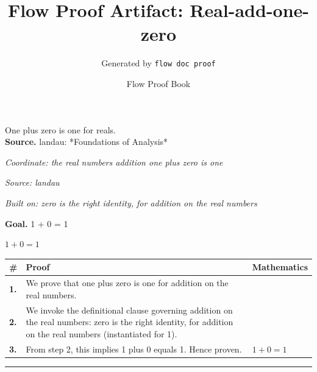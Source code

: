 \documentclass[11pt]{article}
\title{Flow Proof Artifact: Real-add-one-zero}
\author{Generated by \texttt{flow doc proof}}
\date{Flow Proof Book}
\theoremstyle{definition}
\begin{document}
\maketitle
One plus zero is one for reals.\\[0.5em]
\textbf{Source.} landau: *Foundations of Analysis*\\[0.5em]
\bigskip
{}\par
\smallskip\noindent\textit{Coordinate: the real numbers \cdot addition \cdot one plus zero is one}\par
\smallskip\noindent\textit{Source: landau}\par
\smallskip\noindent\textit{Built on: zero is the right identity, for addition on the real numbers}\par
\medskip
\noindent\textbf{Goal.} 1 + 0 = 1\par
\noindent$\displaystyle 1 + 0 = 1$\par
\medskip
\noindent
\begin{tabular}{@{} >{\raggedright\arraybackslash}p{} >{\raggedright\arraybackslash}p{} >{\raggedleft\arraybackslash}p{} @{}}
\textbf{\#} & \textbf{Proof} & \textbf{Mathematics} \\
\midrule
\textbf{1.} & We prove that one plus zero is one for addition on the real numbers. & \\[0.45em]
\textbf{2.} & We invoke the definitional clause governing addition on the real numbers: zero is the right identity, for addition on the real numbers (instantiated for 1). & \\[0.45em]
\textbf{3.} & From step 2, this implies 1 plus 0 equals 1. Hence proven. & $\displaystyle 1 + 0 = 1$ \\[0.45em]
\bottomrule
\end{tabular}
\label{thm:Real-addition-one_plus_zero_is_one}
\par\medskip\hrule
\end{document}
